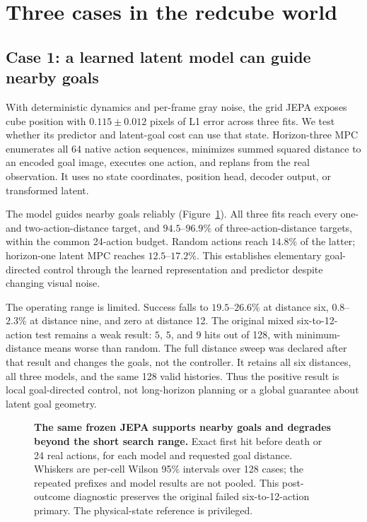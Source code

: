 \section{Three cases in the redcube world}
\label{sec:results}

\subsection{Case 1: a learned latent model can guide nearby goals}
\label{sec:case-one}

With deterministic dynamics and per-frame gray noise, the grid JEPA exposes cube position with
$0.115\pm0.012$ pixels of L1 error across three fits. We test whether its predictor and latent-goal
cost can use that state. Horizon-three MPC enumerates all 64 native action sequences, minimizes
summed squared distance to an encoded goal image, executes one action, and replans from the real
observation. It uses no state coordinates, position head, decoder output, or transformed latent.

The model guides nearby goals reliably (Figure~\ref{fig:goal-distance}). All three fits reach every
one- and two-action-distance target, and $94.5$--$96.9\%$ of three-action-distance targets, within
the common 24-action budget. Random actions reach $14.8\%$ of the latter; horizon-one latent MPC
reaches $12.5$--$17.2\%$. This establishes elementary goal-directed control through the learned
representation and predictor despite changing visual noise.

The operating range is limited. Success falls to $19.5$--$26.6\%$ at distance six, $0.8$--$2.3\%$
at distance nine, and zero at distance 12. The original mixed six-to-12-action test remains a weak
result: $5$, $5$, and $9$ hits out of 128, with minimum-distance means worse than random. The full
distance sweep was declared after that result and changes the goals, not the controller. It retains
all six distances, all three models, and the same 128 valid histories. Thus the positive result is
local goal-directed control, not long-horizon planning or a global guarantee about latent goal geometry.

\begin{figure}[t]
\centering
{}
\caption{\textbf{The same frozen JEPA supports nearby goals and degrades beyond the short search
range.} Exact first hit before death or 24 real actions, for each model and requested goal distance.
Whiskers are per-cell Wilson 95\% intervals over 128 cases; the repeated prefixes and model results
are not pooled. This post-outcome diagnostic preserves the original failed six-to-12-action primary.
The physical-state reference is privileged.}
\label{fig:goal-distance}
\end{figure}

